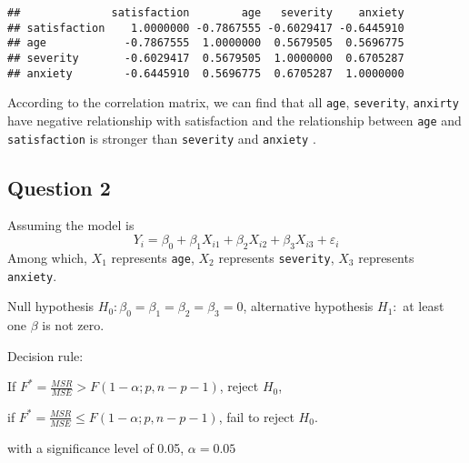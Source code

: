 \documentclass[]{article}
\newenvironment{Shaded}{\begin{snugshade}}{\end{snugshade}}
\newcommand{\KeywordTok}[1]{\textcolor[rgb]{0.13,0.29,0.53}{\textbf{#1}}}
\newcommand{\DataTypeTok}[1]{\textcolor[rgb]{0.13,0.29,0.53}{#1}}
\newcommand{\StringTok}[1]{\textcolor[rgb]{0.31,0.60,0.02}{#1}}
\newcommand{\OperatorTok}[1]{\textcolor[rgb]{0.81,0.36,0.00}{\textbf{#1}}}
\newcommand{\NormalTok}[1]{#1}
\begin{document}
\begin{Shaded}
\end{Shaded}

\begin{verbatim}
##              satisfaction        age   severity    anxiety
## satisfaction    1.0000000 -0.7867555 -0.6029417 -0.6445910
## age            -0.7867555  1.0000000  0.5679505  0.5696775
## severity       -0.6029417  0.5679505  1.0000000  0.6705287
## anxiety        -0.6445910  0.5696775  0.6705287  1.0000000
\end{verbatim}

According to the correlation matrix, we can find that all \texttt{age},
\texttt{severity}, \texttt{anxirty} have negative relationship with
satisfaction and the relationship between \texttt{age} and
\texttt{satisfaction} is stronger than \texttt{severity} and
\texttt{anxiety} .

\subsection{Question 2}\label{question-2-2}

Assuming the model is
\[ Y_i = \beta_0 + \beta_1X_{i1} + \beta_2X_{i2} + \beta_3X_{i3} + \varepsilon_i \]
Among which, \(X_1\) represents \texttt{age}, \(X_2\) represents
\texttt{severity}, \(X_3\) represents \texttt{anxiety}.

Null hypothesis \(H_0 : \beta_0 = \beta_1 = \beta_2 = \beta_3 =0\),
alternative hypothesis \(H_1 :\) at least one \(\beta\) is not zero.

Decision rule:

If \(F^* = \frac{MSR}{MSE} > F(1-\alpha;p,n-p-1)\), reject \(H_0\),

if \(F^* = \frac{MSR}{MSE} \leq F(1-\alpha;p,n-p-1)\), fail to reject
\(H_0\).

with a significance level of 0.05, \(\alpha = 0.05\)

\begin{Shaded}
\end{Shaded}
\end{document}
